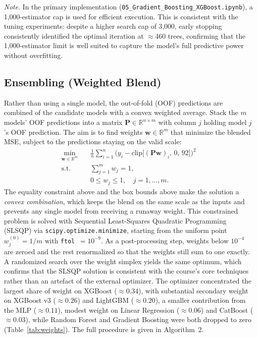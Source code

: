 \documentclass[journal]{IEEEtran}
\begin{document}
\noindent\emph{Note.} In the primary implementation
(\texttt{05\_Gradient\_Boosting\_XGBoost.ipynb}), a 1{,}000-estimator cap is used
for efficient execution. This is consistent with the tuning experiments: despite
a higher search cap of 3{,}000, early stopping consistently identified the
optimal iteration at $\approx$460 trees, confirming that the 1{,}000-estimator
limit is well suited to capture the model's full predictive power without
overfitting.

\subsection{Ensembling (Weighted Blend)}
\label{sec:blend}
Rather than using a single model, the out-of-fold (OOF) predictions are combined
of the candidate models with a convex weighted average. Stack the $m$ models'
OOF predictions into a matrix $\mathbf{P}\in\mathbb{R}^{n\times m}$ with column
$j$ holding model $j$'s OOF prediction. The aim is to find weights
$\mathbf{w}\in\mathbb{R}^{m}$ that minimize the blended MSE, subject to the
predictions staying on the valid scale:
\begin{align}
\min_{\mathbf{w}\in\mathbb{R}^{m}}\quad
& \frac{1}{n}\sum_{i=1}^{n}\Big(y_i-\mathrm{clip}\big[(\mathbf{P}\mathbf{w})_i,\,0,\,92\big]\Big)^{2}
\label{eq:blendobj}\\
\text{s.t.}\quad & \sum_{j=1}^{m}w_j = 1,
\label{eq:blendeq}\\
& 0 \le w_j \le 1,\quad j=1,\dots,m.
\label{eq:blendbox}
\end{align}
The equality constraint above and the box
bounds above make the solution a \emph{convex combination}, which
keeps the blend on the same scale as the inputs and prevents any single model
from receiving a runaway weight. This constrained problem is solved
with Sequential Least-Squares Quadratic Programming (SLSQP) via
\texttt{scipy.optimize.minimize}, starting from the uniform point
$w_j^{(0)}=1/m$ with \texttt{ftol}~$=10^{-9}$. As a post-processing step, weights below $10^{-4}$
are zeroed and the rest renormalized so that
the weights still sum to one exactly. A randomized search over the
weight simplex yields the same optimum,
which confirms that the SLSQP solution is consistent with the course's core
techniques rather than an artefact of the external optimizer. The optimizer
concentrated the largest share of weight on XGBoost ($\approx0.34$), with
substantial secondary weight on XGBoost v3 ($\approx0.26$) and LightGBM
($\approx0.20$), a smaller contribution from the MLP ($\approx0.11$), modest
weight on Linear Regression ($\approx0.06$) and CatBoost ($\approx0.03$), while
Random Forest and Gradient Boosting were both dropped to zero
(Table~\ref{tab:weights}). The full procedure is given in Algorithm~2.
\end{document}
